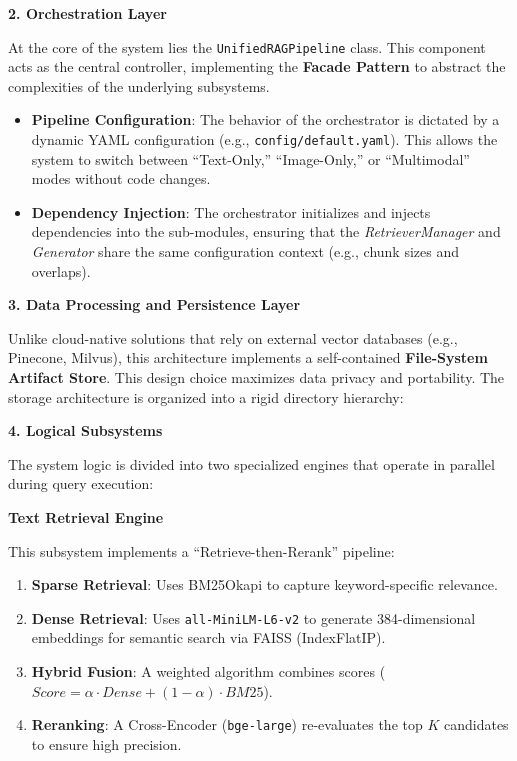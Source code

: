 \textbf{2. Orchestration Layer}

At the core of the system lies the \texttt{UnifiedRAGPipeline} class. This component acts as the central controller, implementing the \textbf{Facade Pattern} to abstract the complexities of the underlying subsystems.
\begin{itemize}
    \item \textbf{Pipeline Configuration}: The behavior of the orchestrator is dictated by a dynamic YAML configuration (e.g., \texttt{config/default.yaml}). This allows the system to switch between ``Text-Only,'' ``Image-Only,'' or ``Multimodal'' modes without code changes.
    \item \textbf{Dependency Injection}: The orchestrator initializes and injects dependencies into the sub-modules, ensuring that the \textit{RetrieverManager} and \textit{Generator} share the same configuration context (e.g., chunk sizes and overlaps).
\end{itemize}

\textbf{3. Data Processing and Persistence Layer}

Unlike cloud-native solutions that rely on external vector databases (e.g., Pinecone, Milvus), this architecture implements a self-contained \textbf{File-System Artifact Store}. This design choice maximizes data privacy and portability. The storage architecture is organized into a rigid directory hierarchy:


\textbf{4. Logical Subsystems}

The system logic is divided into two specialized engines that operate in parallel during query execution:

\textbf{Text Retrieval Engine}

This subsystem implements a ``Retrieve-then-Rerank'' pipeline:
\begin{enumerate}
    \item \textbf{Sparse Retrieval}: Uses BM25Okapi to capture keyword-specific relevance.
    \item \textbf{Dense Retrieval}: Uses \texttt{all-MiniLM-L6-v2} to generate 384-dimensional embeddings for semantic search via FAISS (IndexFlatIP).
    \item \textbf{Hybrid Fusion}: A weighted algorithm combines scores ($Score = \alpha \cdot Dense + (1-\alpha) \cdot BM25$).
    \item \textbf{Reranking}: A Cross-Encoder (\texttt{bge-large}) re-evaluates the top $K$ candidates to ensure high precision.
\end{enumerate}

